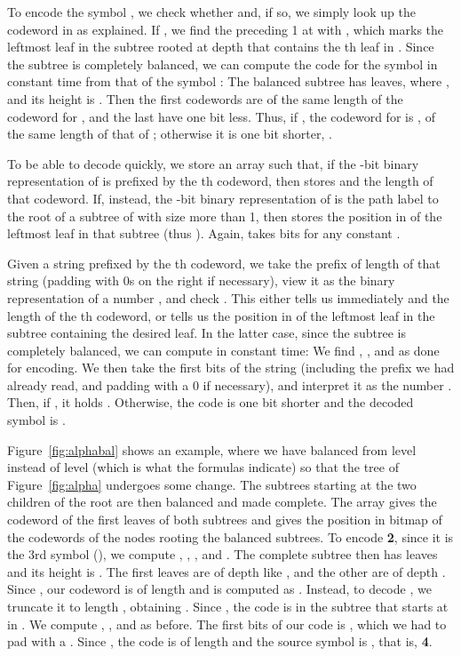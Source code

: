 \documentclass[preprint,12pt]{elsarticle}
\begin{document}
To encode the symbol , we check whether  and, if so, we simply look up the codeword in  as explained.  If , we find the preceding 1 at  with , which marks the leftmost leaf in the subtree rooted at depth  that contains the th leaf in . Since the subtree is completely balanced, we can compute the code for the symbol  in constant time from that of the symbol : The balanced subtree has  leaves, where
, and its height is . Then
the first  codewords are of the same length of the codeword for ,
and the last  have one bit less. Thus, if , the codeword
for  is , of the same length of that of ; otherwise
it is one bit shorter, .

To be able to decode quickly, we store an array  such that, if the -bit binary representation of  is prefixed by the th codeword, then  stores  and the length of that codeword. If, instead, the -bit binary representation of  is the path label to the root of a subtree of  with size more than 1, then  stores the position  in  of the leftmost leaf in that subtree (thus ).  Again,  takes  bits for any constant .

Given a string prefixed by the th codeword, we take the prefix of length  of that string (padding with 0s on the right if necessary), view it as the binary representation of a number , and check .  This either tells us immediately  and the length of the th codeword, or tells us the position  in  of the leftmost leaf in the subtree containing the desired leaf. In the latter case, since the subtree is completely balanced, we can compute  in constant time: We find , ,
and  as done for encoding. We then take the first  bits of the string
(including the prefix we had already read, and padding with a 0 if necessary), and interpret it as the number . Then, if
, it holds . Otherwise, the code is 
one bit shorter and the decoded symbol is .

Figure~\ref{fig:alphabal} shows an example, where we have balanced from level
 instead of level  (which is what the formulas indicate) so that the
tree of Figure~\ref{fig:alpha} undergoes some change. The subtrees starting
at the two children of the root are then balanced and made complete. The array
 gives the codeword of the first leaves of both subtrees and  gives the
position in bitmap  of the codewords of the nodes rooting the balanced
subtrees. To encode {\bf 2}, since it is the 3rd symbol (), we compute
, , , and 
. The complete subtree then has  leaves and its 
height is . The first  leaves are of
depth  like , and the other  are of depth . Since
, our codeword is of length  and is computed as
. Instead, to decode , we truncate it to length ,
obtaining . Since , the code is in the subtree that starts at
 in . We compute , , and  as before. The first 
bits of our code is , which we had to pad with a . Since 
, the code is of length  and
the source symbol is , that is, {\bf 4}.
\end{document}
